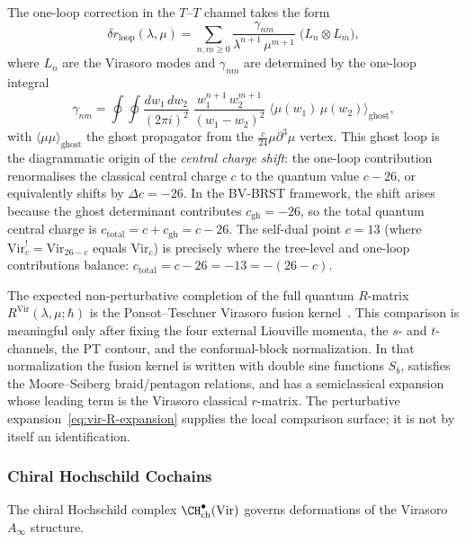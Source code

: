 The one-loop correction in the $T$--$T$ channel takes the form
\begin{equation}
\label{eq:vir-delta-r-loop}
\delta r_{\text{loop}}(\lambda,\mu)
= \sum_{n,m \ge 0}
 \frac{\gamma_{nm}}{\lambda^{n+1}\,\mu^{m+1}}
 \;\bigl(L_n \otimes L_m\bigr),
\end{equation}
where $L_n$ are the Virasoro modes and $\gamma_{nm}$ are determined
by the one-loop integral
\[
\gamma_{nm}
= \oint \oint
 \frac{dw_1\, dw_2}{(2\pi i)^2}\;
 \frac{w_1^{n+1}\, w_2^{m+1}}{(w_1 - w_2)^2}
 \;\langle \mu(w_1)\, \mu(w_2) \rangle_{\text{ghost}},
\]
with $\langle \mu \mu \rangle_{\text{ghost}}$ the ghost propagator
from the $\tfrac{c}{24}\mu\partial^3\mu$ vertex. This ghost loop
is the diagrammatic origin of the \emph{central charge shift}:
the one-loop contribution renormalises the classical central charge
$c$ to the quantum value $c - 26$, or equivalently shifts by
$\Delta c = -26$. In the BV-BRST framework, the shift arises
because the ghost determinant contributes $c_{\text{gh}} = -26$,
so the total quantum central charge is $c_{\text{total}} = c + c_{\text{gh}} = c - 26$.
The self-dual point $c = 13$ (where
$\mathrm{Vir}_c^! = \mathrm{Vir}_{26-c}$ equals $\mathrm{Vir}_c$)
is precisely where the tree-level and one-loop contributions balance:
$c_{\text{total}} = c - 26 = -13 = -(26 - c)$.

\begin{remark}
\label{rem:vir-fusion-kernel}
The expected non-perturbative completion of the full quantum
$R$-matrix $R^{\text{Vir}}(\lambda,\mu;\hbar)$ is the
Ponsot--Teschner Virasoro fusion kernel~\cite{PT01}. This comparison
is meaningful only after fixing the four external Liouville momenta,
the $s$- and $t$-channels, the PT contour, and the conformal-block
normalization. In that normalization the fusion kernel is written with
double sine functions $S_b$, satisfies the Moore--Seiberg
braid/pentagon relations, and has a semiclassical expansion whose
leading term is the Virasoro classical $r$-matrix. The perturbative
expansion~\eqref{eq:vir-R-expansion} supplies the local comparison
surface; it is not by itself an identification.
\end{remark}

\subsubsection{Chiral Hochschild Cochains}

The chiral Hochschild complex $\CH^\bullet_{\text{ch}}(\text{Vir})$ governs deformations of the Virasoro $A_\infty$ structure.

